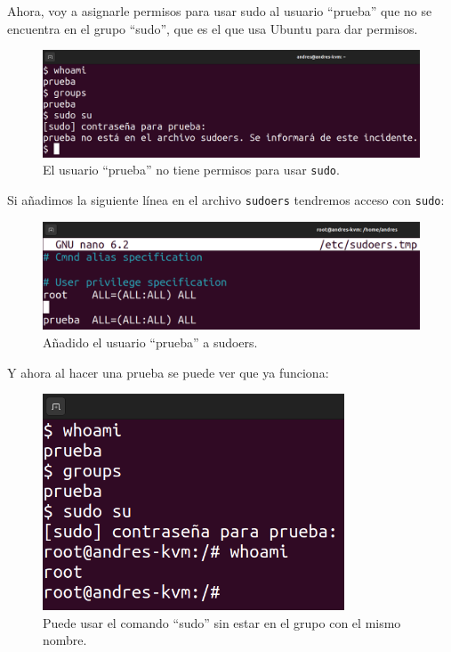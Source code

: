 \documentclass{article}
\begin{document}
\bigskip

Ahora, voy a asignarle permisos para usar sudo al usuario ``prueba'' que no se encuentra en el grupo ``sudo'', que es el que usa Ubuntu para dar permisos.

\begin{figure}[H]
    \includegraphics[width=\textwidth]{imagenes/sudoprueba.png}
    \caption{El usuario ``prueba'' no tiene permisos para usar \texttt{sudo}.}
\end{figure}

\bigskip

Si añadimos la siguiente línea en el archivo \verb|sudoers| tendremos acceso con \verb|sudo|:

\begin{figure}[H]
    \includegraphics[width=\textwidth]{imagenes/sudoersprueba.png}
    \caption{Añadido el usuario ``prueba'' a sudoers.}
\end{figure}

\newpage

Y ahora al hacer una prueba se puede ver que ya funciona:

\begin{figure}[H]
    \centering
    \includegraphics[width=0.8\textwidth]{imagenes/sudopruebaok.png}
    \caption{Puede usar el comando ``sudo'' sin estar en el grupo con el mismo nombre.}
\end{figure}
\end{document}
